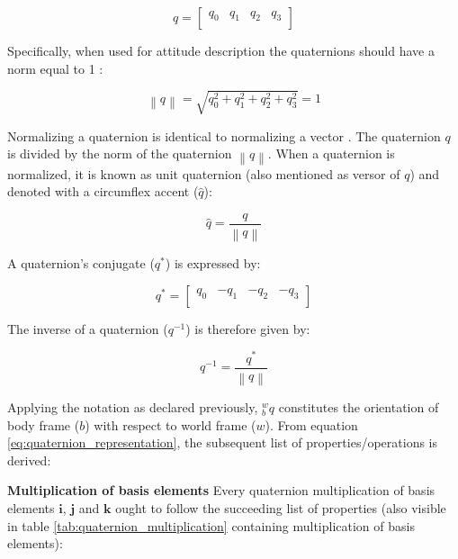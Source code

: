 \begin{equation}
  q =     \begin{bmatrix}
    q_0 & q_1 & q_2 & q_3 \\
  \end{bmatrix}
  \label{eq:quaternion_vector}
\end{equation}

Specifically, when used for attitude description the quaternions should have a norm equal to 1 \cite{valenti2015keeping}:

\begin{equation}
  \left\lVert q\right\rVert =\sqrt{q^2_0 + q^2_1 + q^2_2 + q^2_3} =1
\end{equation}

Normalizing a quaternion is identical to normalizing a vector \cite{bar1985attitude}. The quaternion $q$ is divided by the norm of the quaternion $\left\lVert q \right\rVert$. When a quaternion is normalized, it is known as unit quaternion (also mentioned as versor of $q$) and denoted with a circumflex accent ($\hat{q}$):

\begin{equation}
  \hat{q} = \frac{q}{\left\lVert q \right\rVert }
\end{equation}


A quaternion's conjugate ($q^{\ast} $) is expressed by:

\begin{equation}
  q^{\ast}  =\begin{bmatrix}
    q_0 & -q_1 & -q_2 & -q_3 \\
  \end{bmatrix}
\end{equation}

The inverse of a quaternion (${q^{-1}}$) is therefore given by:

\begin{equation}
  q^{-1} = \frac{q^{\ast} }{\left\lVert q \right\rVert }
\end{equation}

Applying the notation as declared previously, ${^w_b}q$ constitutes the orientation of body frame ($b$) with respect to world frame ($w$). From equation \ref{eq:quaternion_representation}, the subsequent list of properties/operations is derived:

\item \textbf{Multiplication of basis elements} Every quaternion multiplication of basis elements $\boldsymbol{i}$, $\boldsymbol{j}$ and $\boldsymbol{k}$ ought to follow the succeeding list of properties (also visible in table \ref{tab:quaternion_multiplication} containing multiplication of basis elements):


